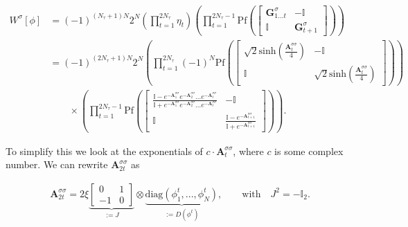 \documentclass{article}
\begin{document}
\begin{align}
	W^{\sigma}\left[ \phi \right] &= (-1)^{\left(N_{\tau}+1\right)N}2^{N} \left(\prod_{t=1}^{2N_\tau} \eta_t\right)\left(\prod_{t=1}^{2N_\tau - 1} \mathrm{Pf} \left(\begin{bmatrix}
		\boldsymbol{G}_{1\dots t}^{\sigma}  & - \mathbb{I} \\
		\mathbb{I} & \boldsymbol{G}_{t + 1}^{\sigma}  
	\end{bmatrix} \right) \right) \nonumber \\
	& = \left(-1\right)^{\left(2N_\tau + 1\right)N}2^{N}\left(\prod_{t=1}^{2N_\tau}(-1)^{N} \mathrm{Pf} \left(\begin{bmatrix}
		\sqrt{2}
		\mathrm{sinh}\left(\frac{\boldsymbol{A}_{t}^{\sigma\sigma}  }{4} \right) & - \mathbb{I} \\
		\mathbb{I} &   \sqrt{2}
		\mathrm{sinh}\left(\frac{\boldsymbol{A}_{t}^{\sigma\sigma}  }{4} \right)	\end{bmatrix} \right)  \right)
	\\&\quad\quad\times\left(\prod_{t=1}^{2N_\tau - 1 } \mathrm{Pf} \left(\begin{bmatrix}
		\frac{\mathbb{I} - e^{-\boldsymbol{A}_{1}^{\sigma\sigma}  }e^{-\boldsymbol{A}_{2}^{\sigma\sigma} }\dots e^{-\boldsymbol{A}_{t}^{\sigma\sigma}  }}{ \mathbb{I} + e^{-\boldsymbol{A}_{1}^{\sigma\sigma}  }e^{-\boldsymbol{A}_{2}^{\sigma\sigma} }\dots e^{-\boldsymbol{A}_{t}^{\sigma\sigma}  }} & - \mathbb{I} \\
		\mathbb{I} & \frac{\mathbb{I} - e^{-\boldsymbol{A}_{t+1}^{\sigma\sigma} } }{\mathbb{I} + e^{-\boldsymbol{A}_{t+1}^{\sigma\sigma}  }} 
	\end{bmatrix} \right) \right) . 
\end{align}

To simplify this we look at the exponentials of $c\cdot \boldsymbol{A}_t^{\sigma\sigma}$, where $c$ is some complex number. We can rewrite $\boldsymbol{A}^{\sigma\sigma}_{2t}$ as

\begin{align}
	\boldsymbol{A}^{\sigma\sigma}_{2t}= 2\xi\underbrace{\begin{bmatrix}
			0 & 1 \\ -1 & 0 
	\end{bmatrix} }_{:= J} \otimes \underbrace{\mathrm{diag}\left(\phi^{t}_{1},...,\phi^{t}_{N} \right) }_{:= D\left(\phi^{t} \right) }, \quad\quad\mathrm{with} \quad J^{2}= -\mathbb{I}_2.
\end{align} 
\end{document}
